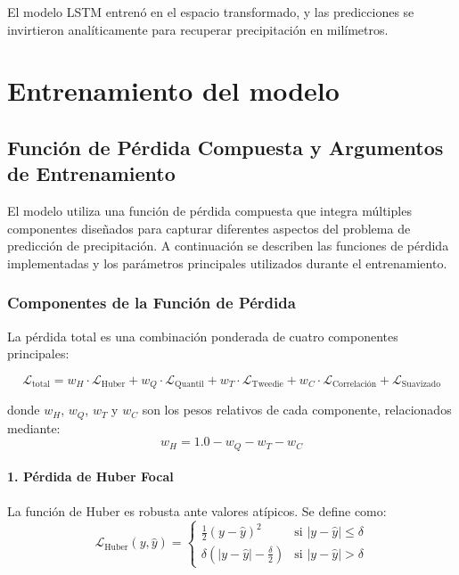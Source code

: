El modelo LSTM entrenó en el espacio transformado, y las predicciones se invirtieron analíticamente para recuperar precipitación en milímetros.

\section{Entrenamiento del modelo}
\label{sec:entrenamiento_modelo}


\subsection{Función de Pérdida Compuesta y Argumentos de Entrenamiento}

El modelo utiliza una función de pérdida compuesta que integra múltiples componentes diseñados para capturar diferentes aspectos del problema de predicción de precipitación. A continuación se describen las funciones de pérdida implementadas y los parámetros principales utilizados durante el entrenamiento.

\subsubsection{Componentes de la Función de Pérdida}

La pérdida total es una combinación ponderada de cuatro componentes principales:

\begin{equation}
	\mathcal{L}_{\text{total}} = w_H \cdot \mathcal{L}_{\text{Huber}} + w_Q \cdot \mathcal{L}_{\text{Quantil}} + w_T \cdot \mathcal{L}_{\text{Tweedie}} + w_C \cdot \mathcal{L}_{\text{Correlación}} + \mathcal{L}_{\text{Suavizado}}
\end{equation}

donde $w_H$, $w_Q$, $w_T$ y $w_C$ son los pesos relativos de cada componente, relacionados mediante:
\begin{equation}
	w_H = 1.0 - w_Q - w_T - w_C
\end{equation}


\paragraph{1. Pérdida de Huber Focal} 
La función de Huber es robusta ante valores atípicos. Se define como:
\begin{equation}
	\mathcal{L}_{\text{Huber}}(y, \hat{y}) = \begin{cases}
		\frac{1}{2}(y - \hat{y})^2 & \text{si } |y - \hat{y}| \leq \delta \\
		\delta \left(|y - \hat{y}| - \frac{\delta}{2}\right) & \text{si } |y - \hat{y}| > \delta
	\end{cases}
\end{equation}

